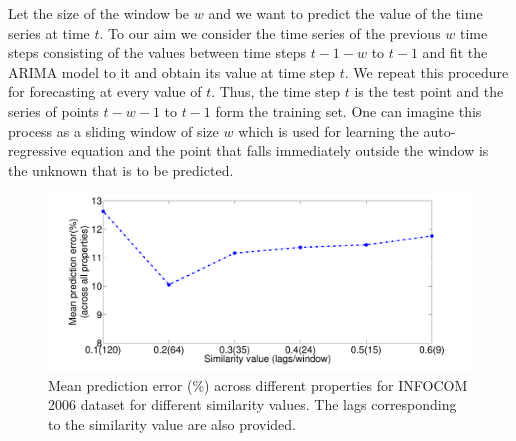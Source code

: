   Let the size of the window be $w$ and we want to predict the value of the time series at time $t$. To our aim we consider the time series of the previous $w$ 
  time steps consisting of the values between time steps $t-1-w$ to $t-1$ and fit the ARIMA model to it and obtain its value at time step $t$. 
 We repeat this procedure for forecasting at every value of $t$. Thus, the time step $t$ is the test point and the series of points $t-w-1$ to $t-1$ form the 
  training set. One can imagine this process as a sliding window of size $w$ which is used for learning the auto-regressive equation and the point that falls immediately 
  outside the window is the unknown that is to be predicted.
  
  \begin{figure}
 \begin{center}
  \includegraphics[width=0.75\columnwidth, angle=0]{./texfiles/Chapter_1/fig/error_similarity_val-eps-converted-to.pdf}
  \caption{\label{fig_err} Mean prediction error (\%) across different properties for INFOCOM 2006 dataset for different similarity values. The lags corresponding to the similarity 
  value are also provided.}
  \end{center}
 \end{figure}
  
